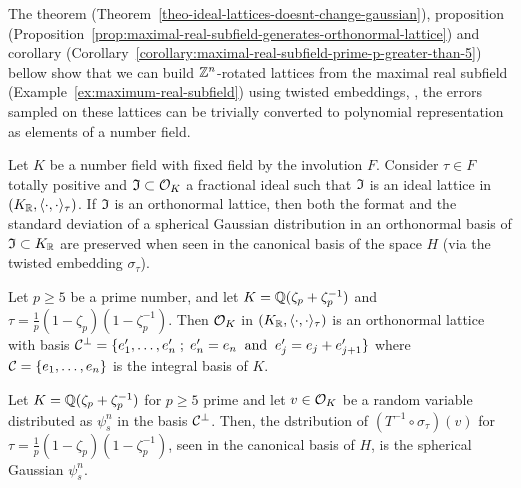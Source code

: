 \documentclass[a4paper,12pt]{article}
\begin{document}
\begin{text}
  The theorem (Theorem~\ref{theo-ideal-lattices-doesnt-change-gaussian}),
  proposition
  (Proposition~\ref{prop:maximal-real-subfield-generates-orthonormal-lattice})
  and corollary (Corollary~\ref{corollary:maximal-real-subfield-prime-p-greater-than-5}) bellow show that we can build $\mathbb{Z}^n$-rotated
  lattices from the maximal real subfield
  (Example~\ref{ex:maximum-real-subfield}) using twisted embeddings, \ie, the
  errors sampled on these lattices can be trivially converted to polynomial
  representation as elements of a number field.
\end{text}

\begin{theorem}\label{theo-ideal-lattices-doesnt-change-gaussian}
  Let $K$ be a number field with fixed field by the involution $F$. Consider $\tau
  \in F$ totally positive and $\mathfrak{I} \subset \mathcal{O}_K$ a fractional ideal such that $\mathfrak{I}$ is an
  ideal lattice in $(K_{\mathbb{R}} , \langle \cdot,\cdot \rangle_\tau )$. If $\mathfrak{I}$ is an orthonormal lattice, then
  both the format and the standard deviation of a spherical Gaussian
  distribution in an orthonormal basis of $\mathfrak{I} \subset K_{\mathbb{R}}$ are preserved when seen in
  the canonical basis of the space $H$ (via the twisted embedding $\sigma_\tau$).
\end{theorem}

\begin{proposition}\label{prop:maximal-real-subfield-generates-orthonormal-lattice}
Let $p \geq 5$ be a prime number, and let $K = \mathbb{Q}(\zeta_{p} + \zeta_{p} ^{-1})$ and $\tau =
  \frac{1}{p}(1 - \zeta_p)( 1 - \zeta^{- 1}_p)$. Then $\mathcal{O}_K$ in $(K_{\mathbb{R}},\langle{\cdot,\cdot}\rangle_\tau)$ is an
  orthonormal lattice with basis $\mathcal{C}^\perp = \{e_1^\prime, \dots, e^\prime_n \;;\; e^\prime_n = e_n
  \;\; \text{and} \;\; e^\prime_j = e_j +  e^\prime_{j+ 1} \}$ where $\mathcal{C} = \{e_1,\dots,e_n\}$
  is the integral basis of $K$.
\end{proposition}

\begin{corollary}\label{corollary:maximal-real-subfield-prime-p-greater-than-5}
  Let $K = \mathbb{Q}(\zeta_{p} + \zeta_{p} ^{-1})$ for $p \geq 5$ prime and let $v \in \mathcal{O}_K$ be a random variable
  distributed as $\psi_s^n$ in the basis $\mathcal{C}^\perp$. Then, the dstribution of $(T^{-1}
  \circ \sigma_\tau)(v)$ for $\tau = \frac{1}{p}(1 - \zeta_p)( 1 - \zeta^{- 1}_p)$, seen in the
  canonical basis of $H$, is the spherical Gaussian $\psi_s^n$.
\end{corollary}
\end{document}
